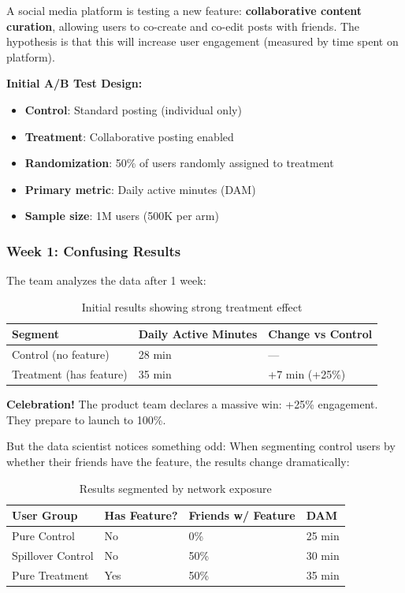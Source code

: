 A social media platform is testing a new feature: \textbf{collaborative content curation}, allowing users to co-create and co-edit posts with friends. The hypothesis is that this will increase user engagement (measured by time spent on platform).

\textbf{Initial A/B Test Design:}
\begin{itemize}
    \item \textbf{Control}: Standard posting (individual only)
    \item \textbf{Treatment}: Collaborative posting enabled
    \item \textbf{Randomization}: 50\% of users randomly assigned to treatment
    \item \textbf{Primary metric}: Daily active minutes (DAM)
    \item \textbf{Sample size}: 1M users (500K per arm)
\end{itemize}

\subsubsection{Week 1: Confusing Results}

The team analyzes the data after 1 week:

\begin{table}[h]
\centering
\begin{tabular}{lll}
\toprule
\textbf{Segment} & \textbf{Daily Active Minutes} & \textbf{Change vs Control} \\
\midrule
Control (no feature) & 28 min & --- \\
Treatment (has feature) & 35 min & +7 min (+25\%) \\
\bottomrule
\end{tabular}
\caption{Initial results showing strong treatment effect}
\end{table}

\textbf{Celebration!} The product team declares a massive win: +25\% engagement. They prepare to launch to 100\%.

But the data scientist notices something odd: When segmenting control users by whether their friends have the feature, the results change dramatically:

\begin{table}[h]
\centering
\begin{tabular}{llll}
\toprule
\textbf{User Group} & \textbf{Has Feature?} & \textbf{Friends w/ Feature} & \textbf{DAM} \\
\midrule
Pure Control & No & 0\% & 25 min \\
Spillover Control & No & 50\% & 30 min \\
Pure Treatment & Yes & 50\% & 35 min \\
\bottomrule
\end{tabular}
\caption{Results segmented by network exposure}
\end{table}


